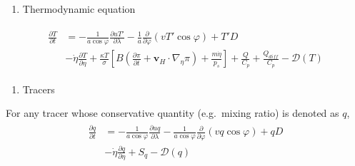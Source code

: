 \begin{enumerate}
\def\labelenumi{\arabic{enumi}.}
\tightlist
\item
  Thermodynamic equation
\end{enumerate}

\begin{eqnarray}
\begin{aligned}
\frac{\partial T}{\partial t}
&= - \frac{1}{a\cos\varphi}
\frac{\partial uT'}{\partial \lambda}
- \frac{1}{a}
\frac{\partial }{\partial \varphi} ( vT' \cos\varphi )
+ T' D\\
&- \dot{\eta}
\frac{\partial T }{\partial \eta}
+ \frac{\kappa T}{\sigma} \left[ B\left( \frac{\partial \pi}{\partial t}
+ {\mathbf{v}}_{H} \cdot \nabla_{\eta}\pi \right)
+ \frac{ m\dot{\eta} }{ p_s }
\right]
+ \frac{Q}{C_{p}}
+ \frac{Q_{diff}}{C_{p}}
- {\mathcal D}(T)  \end{aligned}\end{eqnarray}

\begin{enumerate}
\def\labelenumi{\arabic{enumi}.}
\tightlist
\item
  Tracers
\end{enumerate}

For any tracer whose conservative quantity (e.g.~mixing ratio) is denoted as \(q\), \begin{eqnarray}
\begin{aligned}
\frac{\partial q}{\partial t}
&=  - \frac{1}{a\cos\varphi}
\frac{\partial uq}{\partial \lambda}
- \frac{1}{a\cos\varphi}
\frac{\partial }{\partial \varphi} (vq \cos\varphi)
+ q D \\
&- \dot{\eta} \frac{\partial q }{\partial \eta}
+ S_{q}
- {\mathcal D}(q) \end{aligned}\end{eqnarray}


